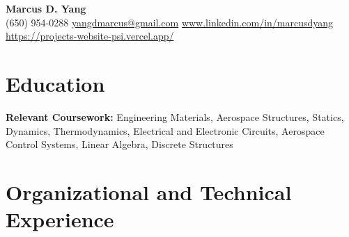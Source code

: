 \newcommand{\entrygap}{\vspace{2pt}}



\begin{center}
  {\fontsize{17}{20}\selectfont\bfseries Marcus D. Yang}\\[2pt]
  {\footnotesize (650) 954-0288 \textbar{} \href{mailto:yangdmarcus@gmail.com}{yangdmarcus@gmail.com} \textbar{} \href{https://www.linkedin.com/in/marcusdyang}{www.linkedin.com/in/marcusdyang} \textbar{} \href{https://projects-website-psi.vercel.app/}{https://projects-website-psi.vercel.app/}}
\end{center}

\section{Education}
\textbf{Relevant Coursework:} Engineering Materials, Aerospace Structures, Statics, Dynamics, Thermodynamics, Electrical and Electronic Circuits, Aerospace Control Systems, Linear Algebra, Discrete Structures

\section{Organizational and Technical Experience}


